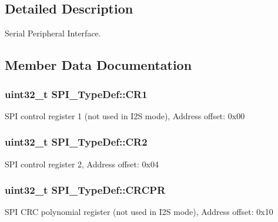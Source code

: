 \subsection{Detailed Description}
Serial Peripheral Interface. 

\subsection{Member Data Documentation}
\subsubsection[{\texorpdfstring{C\+R1}{CR1}}]{ uint32\+\_\+t S\+P\+I\+\_\+\+Type\+Def\+::\+C\+R1}\hypertarget{struct_s_p_i___type_def_a6ecd5cb63b85c381bd67dc90dd4f573a}{}\label{struct_s_p_i___type_def_a6ecd5cb63b85c381bd67dc90dd4f573a}
S\+PI control register 1 (not used in I2S mode), Address offset\+: 0x00 
\subsubsection[{\texorpdfstring{C\+R2}{CR2}}]{ uint32\+\_\+t S\+P\+I\+\_\+\+Type\+Def\+::\+C\+R2}\hypertarget{struct_s_p_i___type_def_a38cb89a872e456e6ecd29b6c71d85600}{}\label{struct_s_p_i___type_def_a38cb89a872e456e6ecd29b6c71d85600}
S\+PI control register 2, Address offset\+: 0x04 
\subsubsection[{\texorpdfstring{C\+R\+C\+PR}{CRCPR}}]{ uint32\+\_\+t S\+P\+I\+\_\+\+Type\+Def\+::\+C\+R\+C\+PR}\hypertarget{struct_s_p_i___type_def_a609d2a279b1927846a991deb9d0dc0b0}{}\label{struct_s_p_i___type_def_a609d2a279b1927846a991deb9d0dc0b0}
S\+PI C\+RC polynomial register (not used in I2S mode), Address offset\+: 0x10 
